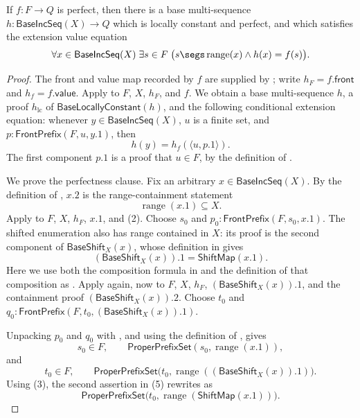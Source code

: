 \begin{lemma}
If $f:F\to Q$ is perfect, then there is a base multi-sequence
$h:\mathsf{BaseIncSeq}(X)\to Q$ which is locally constant and perfect, and
which satisfies the extension value equation
\[
\forall x\in\mathsf{BaseIncSeq}(X)\;\exists s\in F\;\bigl(
  s\segs\operatorname{range}(x)\mathbin{\wedge}h(x)=f(s)\bigr).
\]
\end{lemma}
\begin{proof}
The front and value map recorded by $f$ are supplied by
; write $h_F=f.\mathsf{front}$ and
$h_f=f.\mathsf{value}$.  Apply  to
$F$, $X$, $h_F$, and $f$.  We obtain a base multi-sequence $h$, a proof
$h_{\mathrm{lc}}$ of $\mathsf{BaseLocallyConstant}(h)$, and the following
conditional extension equation: whenever $y\in\mathsf{BaseIncSeq}(X)$,
$u$ is a finite set, and
$p:\mathsf{FrontPrefix}(F,u,y.1)$, then
\[
 h(y)=h_f\!\left(\langle u,p.1\rangle\right).                 \tag{1}
\]
The first component $p.1$ is a proof that $u\in F$, by the definition of
.

We prove the perfectness clause.  Fix an arbitrary
$x\in\mathsf{BaseIncSeq}(X)$.  By the definition of
, $x.2$ is the range-containment statement
\[
 \operatorname{range}(x.1)\subseteq X.                         \tag{2}
\]
Apply  to $F$, $X$, $h_F$, $x.1$, and (2).
Choose $s_0$ and
$p_0:\mathsf{FrontPrefix}(F,s_0,x.1)$.  The shifted enumeration also has
range contained in $X$: its proof is the second component of
$\mathsf{BaseShift}_X(x)$, whose definition in  gives
\[
 (\mathsf{BaseShift}_X(x)).1=\mathsf{ShiftMap}(x.1).              \tag{3}
\]
Here we use both the composition formula in  and the
definition of that composition as .  Apply
 again, now to $F$, $X$, $h_F$,
$(\mathsf{BaseShift}_X(x)).1$, and the containment proof
$(\mathsf{BaseShift}_X(x)).2$.  Choose $t_0$ and
$q_0:\mathsf{FrontPrefix}(F,t_0,(\mathsf{BaseShift}_X(x)).1)$.

Unpacking $p_0$ and $q_0$ with , and using the
definition of , gives
\[
 s_0\in F,\qquad
 \mathsf{ProperPrefixSet}(s_0,\operatorname{range}(x.1)),
\tag{4}
\]
and
\[
 t_0\in F,\qquad
 \mathsf{ProperPrefixSet}
   \bigl(t_0,\operatorname{range}((\mathsf{BaseShift}_X(x)).1)\bigr).
\tag{5}
\]
Using (3), the second assertion in (5) rewrites as
\[
 \mathsf{ProperPrefixSet}
   \bigl(t_0,\operatorname{range}(\mathsf{ShiftMap}(x.1))\bigr).
\tag{6}
\]


\end{proof}
